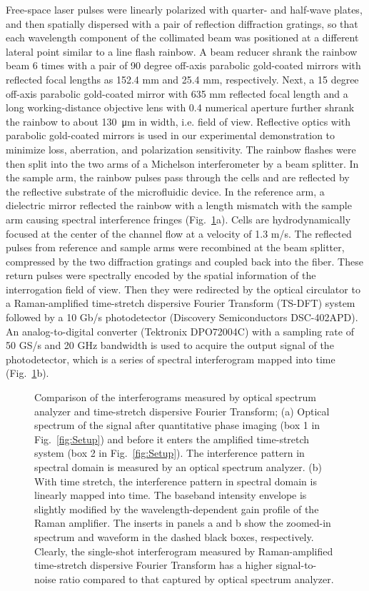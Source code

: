 \documentclass[aps,pra,reprint,longbibliography,superscriptaddress]{revtex4-1}
\begin{document}
Free-space laser pulses were linearly polarized with quarter- and half-wave plates, and then spatially dispersed with a pair of reflection diffraction gratings, so that each wavelength component of the collimated beam was positioned at a different lateral point similar to a line flash rainbow. A beam reducer shrank the rainbow beam 6 times with a pair of 90 degree off-axis parabolic gold-coated mirrors with reflected focal lengths as 152.4 mm and 25.4 mm, respectively. Next, a 15 degree off-axis parabolic gold-coated mirror with 635 mm reflected focal length and a long working-distance objective lens with 0.4 numerical aperture further shrank the rainbow to about \SI{130}{\micro\meter} in width, i.e. field of view. Reflective optics with parabolic gold-coated mirrors is used in our experimental demonstration to minimize loss, aberration, and polarization sensitivity. The rainbow flashes were then split into the two arms of a Michelson interferometer by a beam splitter. In the sample arm, the rainbow pulses pass through the cells and are reflected by the reflective substrate of the microfluidic device. In the reference arm, a dielectric mirror reflected the rainbow with a length mismatch with the sample arm causing spectral interference fringes (Fig.~\ref{fig:OSA}a). Cells are hydrodynamically focused at the center of the channel flow at a velocity of 1.3 m/s. The reflected pulses from reference and sample arms were recombined at the beam splitter, compressed by the two diffraction gratings and coupled back into the fiber. These return pulses were spectrally encoded by the spatial information of the interrogation field of view. Then they were redirected by the optical circulator to a Raman-amplified time-stretch dispersive Fourier Transform (TS-DFT) system followed by a 10 Gb/s photodetector (Discovery Semiconductors DSC-402APD). An analog-to-digital converter (Tektronix DPO72004C) with a sampling rate of 50 GS/s and 20 GHz bandwidth is used to acquire the output signal of the photodetector, which is a series of spectral interferogram mapped into time (Fig.~\ref{fig:OSA}b). 


\begin{figure}
\caption{\label{fig:OSA} Comparison of the interferograms measured by optical spectrum analyzer and time-stretch dispersive Fourier Transform; (a) Optical spectrum of the signal after quantitative phase imaging (box 1 in Fig.~\ref{fig:Setup}) and before it enters the amplified time-stretch system (box 2 in Fig.~\ref{fig:Setup}). The interference pattern in spectral domain is measured by an optical spectrum analyzer. (b) With time stretch, the interference pattern in spectral domain is linearly mapped into time. The baseband intensity envelope is slightly modified by the wavelength-dependent gain profile of the Raman amplifier. The inserts in panels a and b show the zoomed-in spectrum and waveform in the dashed black boxes, respectively. Clearly, the single-shot interferogram measured by Raman-amplified time-stretch dispersive Fourier Transform has a higher signal-to-noise ratio compared to that captured by optical spectrum analyzer.}
\end{figure}
\end{document}
